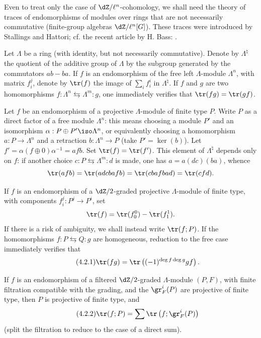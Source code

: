 Even to treat only the case of $\dZ/\ell^n$-cohomology, we shall need the
theory of traces of endomorphisms of modules over rings that are not
necessarily commutative (finite-group algebras $\dZ/\ell^n[G]$). These
traces were introduced by Stallings and Hattori; cf. the recent article by H. Bass: .

Let $\Lambda$ be a ring (with identity, but not necessarily commutative).
Denote by $\Lambda^\natural$ the quotient of the additive group of $\Lambda$
by the subgroup generated by the commutators $a b-b a$. If $f$ is an
endomorphism of the free left $\Lambda$-module $\Lambda^n$, with matrix
$f_i^j$, denote by $\tr(f)$ the image of $\sum_i f_i^i$ in
$\Lambda^\natural$. If $f$ and $g$ are two homomorphisms
$f:\Lambda^n \leftrightarrows \Lambda^m : g$, one immediately verifies that
$\tr(f g) = \tr(g f)$.

Let $f$ be an endomorphism of a projective $\Lambda$-module of finite type
$P$. Write $P$ as a direct factor of a free module $\Lambda^n$: this means
choosing a module $P'$ and an isomorphism
$\alpha:P\oplus P'\iso \Lambda^n$, or equivalently choosing a homomorphism
$a:P\to \Lambda^n$ and a retraction $b:\Lambda^n\to P$ (take
$P'=\ker(b)$). Let $f'=\alpha(f\oplus 0)\alpha^{-1} =af b$. Set
$\tr(f) = \tr(f')$. This element of $\Lambda^\natural$ depends only on $f$:
if another choice $c:P\leftrightarrows \Lambda^m:d$ is made, one has
$a=a(dc)(ba)$, whence
\[
 \tr(a f b) = \tr(adcbafb) = \tr(cbafbad) = \tr(cfd) \text{.}
\]

If $f$ is an endomorphism of a $\dZ/2$-graded projective
$\Lambda$-module of finite type, with components $f_i^j:P^j\to P^i$, set
\[
  \tr(f) = \tr(f_0^0) - \tr(f_1^1) \text{.}
\]
If there is a risk of ambiguity, we shall instead write $\tr(f;P)$. If the
homomorphisms $f:P\leftrightarrows Q:g$ are homogeneous, reduction to the
free case immediately verifies that
\begin{equation*}\tag{4.2.1}\label{II:eq:4-2-1}
  \tr(f g) = \tr\left((-1)^{\deg f \deg g} g f\right) \text{.}
\end{equation*}

If $f$ is an endomorphism of a filtered $\dZ/2$-graded $\Lambda$-module
$(P,F)$, with finite filtration compatible with the grading, and the
$\gr_F^i(P)$ are projective of finite type, then $P$ is projective of finite
type, and
\begin{equation*}\tag{4.2.2}\label{II:eq:4-2-2}
  \tr(f;P) = \sum \tr\left(f; \gr_F^i(P) \right)
\end{equation*}
(split the filtration to reduce to the case of a direct sum).






